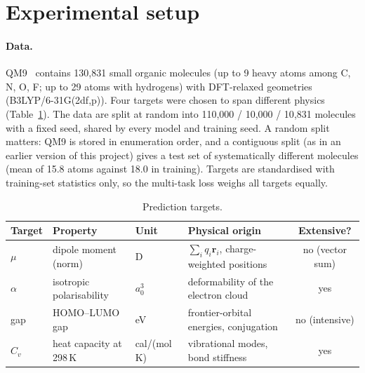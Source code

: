 \documentclass[11pt,a4paper]{article}
\begin{document}
\section{Experimental setup}\label{sec:setup}

\paragraph{Data.} QM9~\cite{ramakrishnan2014} contains 130{,}831 small organic molecules
(up to 9 heavy atoms among C, N, O, F; up to 29 atoms with hydrogens) with DFT-relaxed
geometries (B3LYP/6-31G(2df,p)). Four targets were chosen to span different physics
(Table~\ref{tab:targets}). The data are split at random into 110{,}000 / 10{,}000 / 10{,}831
molecules with a fixed seed, shared by every model and training seed. A random split matters:
QM9 is stored in enumeration order, and a contiguous split (as in an earlier version of this
project) gives a test set of systematically different molecules (mean of 15.8 atoms against
18.0 in training). Targets are standardised with training-set statistics only, so the
multi-task loss weighs all targets equally.

\begin{table}[h]
\centering
\small
\setlength{\tabcolsep}{4pt}
\begin{tabular}{llllc}
\toprule
Target & Property & Unit & Physical origin & Extensive? \\
\midrule
$\mu$      & dipole moment (norm)        & D            & $\sum_i q_i \mathbf{r}_i$, charge-weighted positions & no (vector sum) \\
$\alpha$   & isotropic polarisability    & $a_0^3$      & deformability of the electron cloud & yes \\
gap        & HOMO--LUMO gap              & eV           & frontier-orbital energies, conjugation & no (intensive) \\
$C_v$      & heat capacity at 298\,K     & cal/(mol\,K) & vibrational modes, bond stiffness & yes \\
\bottomrule
\end{tabular}
\caption{Prediction targets.}
\label{tab:targets}
\end{table}
\end{document}
